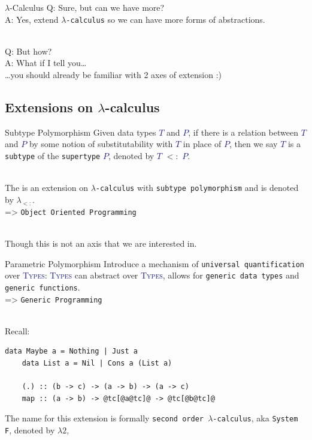 \documentclass[xcolor={usenames,dvipsnames}]{beamer}
\newcommand{\htycon}[1]{\textcolor{MidnightBlue}{\textsc{#1}}}
\begin{document}
\begin{frame}[fragile]{$\lambda$-Calculus}
  Q: Sure, but can we have more?\\
  \pause
  A: Yes, extend \texttt{$\lambda$-calculus} so we can have more forms of abstractions.

  \ \\
  \pause
  Q: But how?\\
  \pause
  A: What if I tell you\ldots\\
  \pause
  \qquad \ldots you should already be familiar with 2 axes of extension :)
\end{frame}


\subsection{Extensions on $\lambda$-calculus}

\begin{frame}[fragile]{Subtype Polymorphism}
  Given data types \htycon{$T$} and \htycon{$P$}, if there is a relation between \htycon{$T$} and \htycon{$P$} by some notion of substitutability with \htycon{$T$} in place of \htycon{$P$}, then we say \htycon{$T$} is a \texttt{subtype} of the \texttt{supertype} \htycon{$P$}, denoted by \htycon{$T$} $<:$ \htycon{$P$}.

  \ \\
  \pause
  The is an extension on \texttt{$\lambda$-calculus} with \texttt{subtype polymorphism} and is denoted by $\lambda_{<:}$.\\
  \pause
  => \texttt{Object Oriented Programming}
  
  \ \\
  \pause
  \scriptsize{Though this is not an axis that we are interested in}.
\end{frame}

\begin{frame}[fragile]{Parametric Polymorphism}
  Introduce a mechanism of \texttt{universal quantification} over \htycon{Types}: \htycon{Types} can abstract over \htycon{Types}, allows for \texttt{generic data types} and \texttt{generic functions}.\\
  \pause
  => \texttt{Generic Programming}

  \ \\
  \pause
  Recall:
  \begin{lstlisting}[style=hask]
    data Maybe a = Nothing | Just a
    data List a = Nil | Cons a (List a)

    (.) :: (b -> c) -> (a -> b) -> (a -> c)
    map :: (a -> b) -> @tc[@a@tc]@ -> @tc[@b@tc]@
  \end{lstlisting}

  \pause
  The name for this extension is formally \texttt{second order $\lambda$-calculus}, aka \texttt{System F}, denoted by $\lambda2$,
\end{frame}
\end{document}
